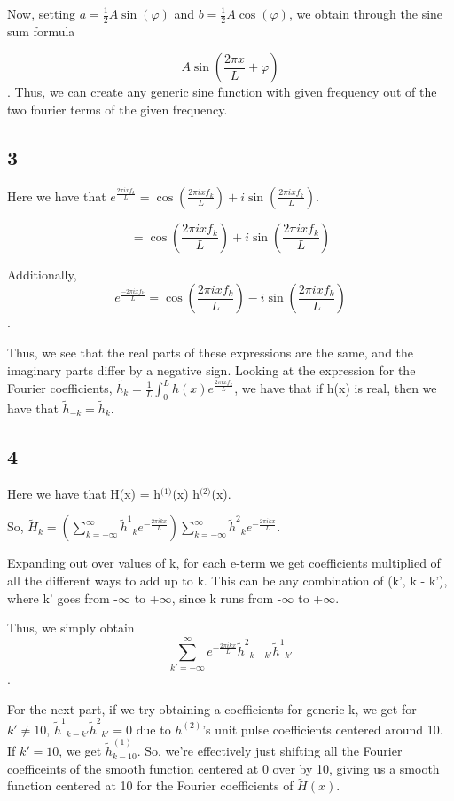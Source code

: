\documentclass[11pt]{article}
\begin{document}
Now, setting $a = \frac{1}{2} A \sin (\varphi )$ and $b = \frac{1}{2} A \cos
(\varphi )$, we obtain through the sine sum formula 

$$A \sin (\frac{2 \pi x}{L} + \varphi)$$. Thus, we can create any generic sine
function with given frequency out of the two fourier terms of the given
frequency.

\subsection*{3}
\label{sec-1-3}
Here we have that $e^{\frac{2 \pi i x f_k}{L}} = \cos(\frac{2 \pi i x
f_k}{L}) + i \sin(\frac{2 \pi i x f_k}{L})$.

$$ = \cos(\frac{2 \pi i x f_k}{L}) + i \sin(\frac{2 \pi i x f_k}{L})$$

Additionally, $$e^{\frac{-2 \pi i x f_k}{L}} = \cos(\frac{2 \pi i x f_k}{L}) -
i \sin(\frac{2 \pi i x f_k}{L})$$.

Thus, we see that the real parts of these expressions are the same, and the
imaginary parts differ by a negative sign. Looking at the expression for the
Fourier coefficients, $\tilde{h_k} = \frac{1}{L} \int_0^L h(x) e^{\frac{2 \pi i
x f_k}{L}}$, we have that if h(x) is real, then we have that $\tilde{h}_{-k} =
\tilde{h}_k$.

\subsection*{4}
\label{sec-1-4}
Here we have that H(x) = h$^{\text{(1)}}$(x) h$^{\text{(2)}}$(x).

So, $\tilde{H}_k=\left(\sum _{k=-\infty }^{\infty } \tilde{h}^1{}_k e^{-\frac{2
\pi i k x}{L}}\right) \sum _{k=-\infty }^{\infty } \tilde{h}^2{}_k e^{-\frac{2
\pi i k x}{L}}$.

Expanding out over values of k, for each e-term we get coefficients multiplied
of all the different ways to add up to k. This can be any combination of (k',
k - k'), where k' goes from -$\infty$ to +$\infty$, since k runs from -$\infty$ to
+$\infty$.

Thus, we simply obtain $$\sum _{k'=-\infty }^{\infty } e^{-\frac{2 \pi i k
x}{L}} \tilde{h}^2{}_{k-k'} \tilde{h}^1{}_{k'}$$.

For the next part, if we try obtaining a coefficients for generic k, we get for
$k'\neq 10$, $\tilde{h}^1{}_{k-k'} \tilde{h}^2{}_{k'} = 0$ due to $h^{(2)}$'s
unit pulse coefficients centered around 10. If $k' = 10$, we get
$\tilde{h}^{(1)}_{k-10}$. So, we're effectively just shifting all the Fourier
coefficeints of the smooth function centered at 0 over by 10, giving us a
smooth function centered at 10 for the Fourier coefficients of $\tilde{H}(x)$.
\end{document}
